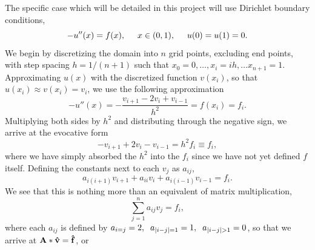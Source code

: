 \documentclass[11pt,a4paper]{article}
\begin{document}
The specific case which will be detailed in this project will use Dirichlet boundary conditions,
\begin{equation}
-u''(x)=f(x), \hspace{0.5 cm} x\in(0,1), \hspace{0.5 cm} u(0) = u(1) = 0.
\end{equation}
We begin by discretizing the domain into $n$ grid points, excluding end points, with step spacing $h = 1/(n+1)$ such that $x_0 = 0, \dots , x_i = ih, \dots x_{n+1} = 1$. Approximating $u(x)$ with the discretized function $v(x_i)$, so that $u(x_i) \approx v(x_i) = v_i$, we use the following approximation
\begin{equation}
-u''(x) = -\frac{v_{i+1} - 2v_i + v_{i-1}}{h^2} = f(x_i) = f_i.
\end{equation}
Multiplying both sides by $h^2$ and distributing through the negative sign, we arrive at the evocative form
\begin{equation}
-v_{i+1} + 2v_i - v_{i-1} = h^2 f_i \equiv f_i, 
\end{equation}
where we have simply absorbed the $h^2$ into the $f_i$ since we have not yet defined $f$ itself. Defining the constants next to each $v_j$ as $a_{ij}$,
\begin{equation}
a_{i(i+1)} v_{i+1} + a_{ii} v_i + a_{i(i-1)} v_{i-1} = f_i.
\end{equation}
We see that this is nothing more than an equivalent of matrix multiplication,
\begin{equation}
\sum\limits_{j=1}^n a_{ij} v_{j} = f_i,
\end{equation}
where each $a_{ij}$ is defined by $a_{i=j} = 2, \hspace{0.2 cm} a_{|i-j|=1} = 1, \hspace{0.2 cm} a_{|i-j|>1} = 0$, so that we arrive at $\bf{A}*\hat{v} = \hat{f}$, or
\end{document}
